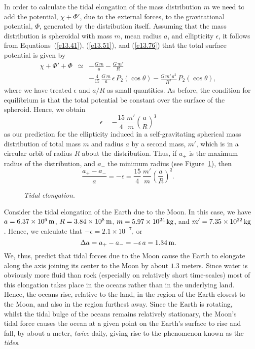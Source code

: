In order to calculate the tidal elongation of the mass distribution $m$ we
need to add the  potential, $\chi+\Phi'$, due to the external forces,  to
the gravitational potential, $\Phi$, generated by the distribution itself. Assuming that
the mass distribution is spheroidal with mass $m$, mean radius $a$,
and ellipticity $\epsilon$, it follows from Equations~(\ref{e13.41}), (\ref{e13.51}),
and (\ref{e13.76}) that the total surface potential
is given by
\begin{eqnarray}
\chi +\Phi'+\Phi &\simeq& - \frac{G\,m}{a} - \frac{G\,m'}{R}  \nonumber\\&&
-\frac{4}{15}\,\frac{G\,m}{a}\,\epsilon\,P_2(\cos\theta) - \frac{G\,m'\,a^2}{R^3}\,P_2(\cos\theta),
\end{eqnarray}
where we have treated $\epsilon$ and $a/R$ as small quantities. As before,
the condition for equilibrium is that the total potential be constant
over the surface of the spheroid. Hence, we obtain
\begin{equation}
\epsilon = -\frac{15}{4}\,\frac{m'}{m}\left(\frac{a}{R}\right)^3
\end{equation}
as our prediction for the ellipticity induced in a self-gravitating spherical
mass distribution of total mass $m$ and radius $a$ by a second mass, $m'$, 
which is in a circular orbit  of radius $R$ about the distribution. Thus, if $a_+$ is
the maximum radius of the distribution, and $a_-$ the minimum radius (see Figure~\ref{ftide2}), then
\begin{equation}
 \frac{a_+-a_-}{a} = -\epsilon =  \frac{15}{4}\,\frac{m'}{m}\left(\frac{a}{R}\right)^3.
\end{equation}
\begin{figure}
\epsfysize=1.2in
\centerline{}
\caption{\em Tidal elongation.}\label{ftide2}
\end{figure}

Consider the tidal elongation of the Earth due to the Moon. In this
case, we have $a=6.37\times 10^6\,{\rm m}$, $R=3.84\times 10^8\,{\rm m}$, 
$m=5.97\times 10^{24}\,{\rm kg}$, and $m'=7.35\times 10^{22}\,{\rm kg}$. 
Hence, we calculate that $-\epsilon=2.1\times 10^{-7}$, or
\begin{equation}
\Delta a = a_+-a_- = -\epsilon\,a = 1.34\,{\rm m}.
\end{equation}
We, thus, predict that tidal forces due to the Moon cause the
Earth to elongate along the axis joining its center to the Moon by
about $1.3$ meters. Since water is obviously more fluid than rock
(especially on relatively short time-scales) most of this elongation
takes place in the oceans rather than in the underlying land. Hence,
the oceans rise, relative to the land, in the region of the Earth closest
to the Moon, and also in the region furthest away. Since the Earth
is rotating, whilst the tidal bulge of the oceans remains relatively
stationary, the Moon's tidal force causes the ocean at a given point
on the Earth's surface to rise and fall, by about a meter, {\em twice}\/ daily, giving rise to the
phenomenon known as the {\em tides}.

